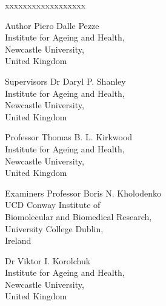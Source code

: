 
\begin{people}
\begin{my_bold_description}{xxxxxxxxxxxxxxxxxx}

 \item[Author]
    Piero Dalle Pezze \\
    Institute for Ageing and Health,\\
    Newcastle University,\\
    United Kingdom

 \item[Supervisors]
    Dr Daryl P. Shanley\\
    Institute for Ageing and Health,\\
    Newcastle University,\\
    United Kingdom

    \vspace{0.2cm}
    Professor Thomas B. L. Kirkwood\\
    Institute for Ageing and Health,\\
    Newcastle University,\\
    United Kingdom

 \item[Examiners]
    Professor Boris N. Kholodenko\\
    UCD Conway Institute of \\
    Biomolecular and Biomedical Research,\\
    University College Dublin,\\
    Ireland 

    \vspace{0.2cm}
    Dr Viktor I. Korolchuk\\
    Institute for Ageing and Health,\\
    Newcastle University,\\
    United Kingdom




\end{my_bold_description}


\end{people}




